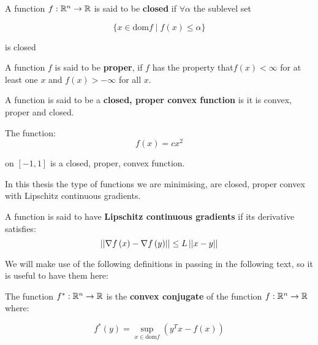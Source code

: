 \begin{definition}
A function \(f: {\mathbb{R}}^n \rightarrow {\mathbb{R}}\) is said to be \textbf{closed} if \(\forall \alpha\) the sublevel set

\begin{equation}
\{x \in \mathrm{dom} f \mid f\left(x\right)\leq \alpha\}
\end{equation}

is closed

\end{definition}

\begin{definition}
A function \(f\) is said to be \textbf{proper}, if \(f\) has the property  that\(f\left(x\right) < \infty\) for at least one \(x\) and \(f\left(x\right)>-\infty\) for all \(x\).
\end{definition}

\begin{definition}
A function is said to be a \textbf{closed, proper convex function} is it is convex, proper and closed.
\end{definition}

\begin{example}
The function:
\begin{equation}
f\left(x\right) = c x^2
\end{equation}

on \([-1, 1]\) is a closed, proper, convex function. 
\end{example}

In this thesis the type of functions we are minimising, are closed, proper convex with Lipschitz continuous gradients. 

\begin{definition}
A function is said to have \textbf{Lipschitz continuous gradients} if its derivative satisfies:
\begin{equation}
\left|\left|\nabla f\left(x\right) - \nabla f\left(y\right)\right|\right| \leq L \left|\left|x - y\right|\right|
\end{equation}

\end{definition}

We will make use of the following definitions in passing in the following text, so it is useful to have them here:

\begin{definition}

The function \(f^*: {\mathbb{R}}^n \rightarrow {\mathbb{R}}\) is the \textbf{convex conjugate} of the function \(f: {\mathbb{R}}^n \rightarrow {\mathbb{R}}\) where:

\begin{equation}
f^*\left(y\right) = \sup_{x \in \mathrm{dom} f} \left(y^Tx - f\left(x\right)\right)
\end{equation}

\end{definition}

